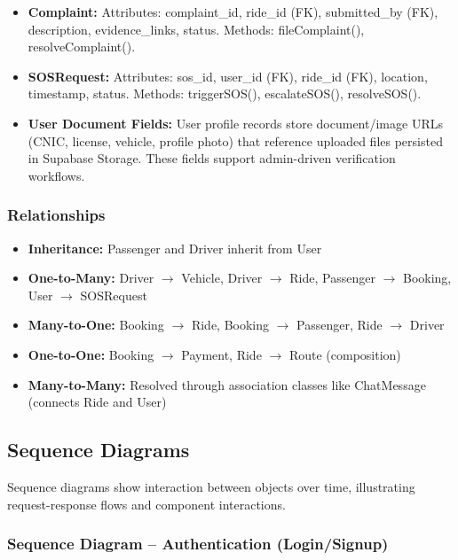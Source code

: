 \begin{itemize}
    \item \textbf{Complaint:} Attributes: complaint\_id, ride\_id (FK), submitted\_by (FK), description, evidence\_links, status. Methods: fileComplaint(), resolveComplaint().
    
    \item \textbf{SOSRequest:} Attributes: sos\_id, user\_id (FK), ride\_id (FK), location, timestamp, status. Methods: triggerSOS(), escalateSOS(), resolveSOS().
    
    \item \textbf{User Document Fields:} User profile records store document/image URLs (CNIC, license, vehicle, profile photo) that reference uploaded files persisted in Supabase Storage. These fields support admin-driven verification workflows.
\end{itemize}

\subsubsection{Relationships}

\begin{itemize}
    \item \textbf{Inheritance:} Passenger and Driver inherit from User
    \item \textbf{One-to-Many:} Driver $\rightarrow$ Vehicle, Driver $\rightarrow$ Ride, Passenger $\rightarrow$ Booking, User $\rightarrow$ SOSRequest
    \item \textbf{Many-to-One:} Booking $\rightarrow$ Ride, Booking $\rightarrow$ Passenger, Ride $\rightarrow$ Driver
    \item \textbf{One-to-One:} Booking $\rightarrow$ Payment, Ride $\rightarrow$ Route (composition)
    \item \textbf{Many-to-Many:} Resolved through association classes like ChatMessage (connects Ride and User)
\end{itemize}

\subsection{Sequence Diagrams}

Sequence diagrams show interaction between objects over time, illustrating request-response flows and component interactions.
\subsubsection{Sequence Diagram – Authentication (Login/Signup)}

